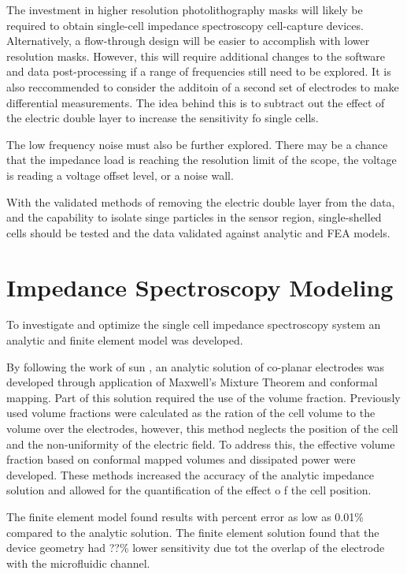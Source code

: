 \par The investment in higher resolution photolithography masks will likely be required to obtain single-cell impedance spectroscopy cell-capture devices. Alternatively, a flow-through design will be easier to accomplish with lower resolution masks. However, this will require additional changes to the software and data post-processing if a range of frequencies still need to be explored. It is also reccommended to consider the additoin of a second set of electrodes to make differential measurements. The idea behind this is to subtract out the effect of the electric double layer to increase the sensitivity fo single cells. 

\par The low frequency noise must also be further explored. There may be a chance that the impedance load is reaching the resolution limit of the scope, the voltage is reading a voltage offset level, or a noise wall. 

\par With the validated methods of removing the electric double layer from the data, and the capability to isolate singe particles in the sensor region, single-shelled cells should be tested and the data validated against analytic and FEA models.

\section{Impedance Spectroscopy Modeling}

\par To investigate and optimize the single cell impedance spectroscopy system an analytic and finite element model was developed. 

\par By following the work of sun \cite{}, an analytic solution of co-planar electrodes was developed through application of Maxwell's Mixture Theorem and conformal mapping. Part of this solution required the use of the volume fraction. Previously used volume fractions were calculated as the ration of the cell volume to the volume over the electrodes, however, this method neglects the position of the cell and the non-uniformity of the electric field. To address this, the effective volume fraction based on conformal mapped volumes and dissipated power were developed. These methods increased the accuracy of the analytic impedance solution and allowed for the quantification of the effect o f the cell position. 

\par The finite element model found results with percent error as low as 0.01\% compared to the analytic solution. The finite element solution found that the device geometry had ??\% lower sensitivity due tot the overlap of the electrode with the microfluidic channel.


